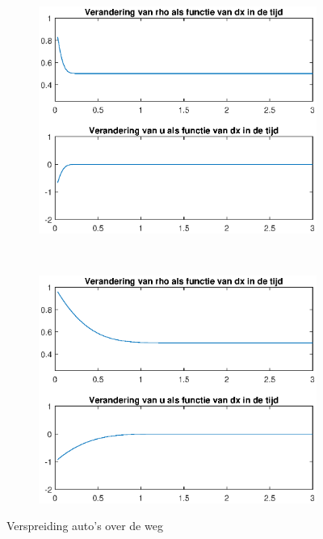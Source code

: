 \documentclass{article}
\begin{document}
\begin{figure}[H]
  \centering
  \begin{subfigure}{0.7\textwidth}
  \includegraphics[width=\textwidth]{ss31.eps}
  \end{subfigure}
  ~
  \begin{subfigure}{0.7\textwidth}
  \includegraphics[width=\textwidth]{ss33.eps}
  \end{subfigure}
  \caption{Verspreiding auto's over de weg}
  \label{fig:scrshots}
\end{figure}
\end{document}
